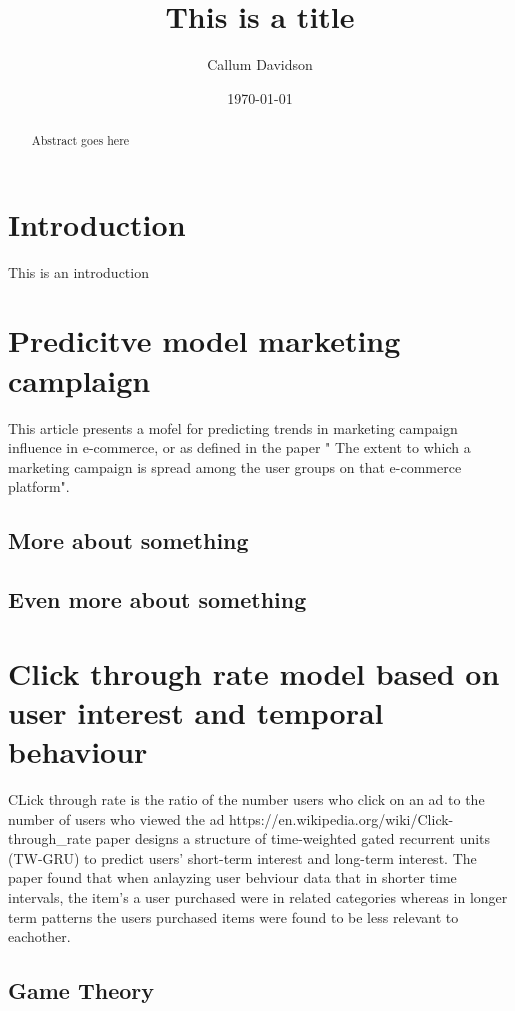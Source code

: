 \documentclass{article}
\title {This is a title}
\author {Callum Davidson}
\date{\today}
\begin{document}
\maketitle
\tableofcontents


\begin{abstract}
Abstract goes here
\end{abstract}

\section{Introduction}
This is an introduction
\label{sec:intro}

\section{Predicitve model marketing camplaign}
This article presents a mofel for predicting trends in marketing campaign influence  in e-commerce, or as defined in the paper " The extent to which a marketing campaign is spread among the user groups on that e-commerce platform". 

\subsection{More about something}

\subsection{Even more about something}

\section{Click through rate model based on user interest and temporal behaviour }


CLick through rate is the ratio of the number users who click on an ad to the number of users who viewed the ad https://en.wikipedia.org/wiki/Click-through_rate
paper designs a structure of time-weighted gated recurrent units (TW-GRU) to predict users’
short-term interest and long-term interest. 
The paper found that when anlayzing user behviour data that in shorter time intervals, the item's a user purchased were in related categories whereas in longer term patterns the users purchased items were found to be less relevant to eachother. 
\subsection{Game Theory}
\end{document}
